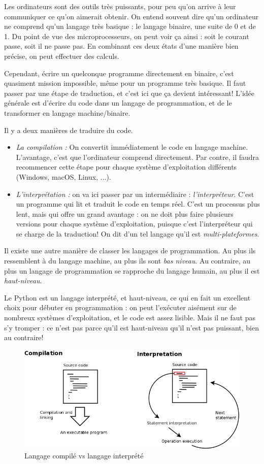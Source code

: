 Les ordinateurs sont des outils très puissants, pour peu qu'on arrive à leur communiquer ce qu'on aimerait obtenir. On entend souvent dire qu'un ordinateur ne comprend qu'un langage très basique : le langage binaire, une suite de 0 et de 1. Du point de vue des microprocesseurs, on peut voir ça ainsi : soit le courant passe, soit il ne passe pas. En combinant ces deux états d'une manière bien précise, on peut effectuer des calculs.

Cependant, écrire un quelconque programme directement en binaire, c'est quasiment mission impossible, même pour un programme très basique. Il faut passer par une étape de traduction, et c'est ici que ça devient intéressant! L'idée générale est d'écrire du code dans un langage de programmation, et de le transformer en langage machine/binaire.

Il y a deux manières de traduire du code.
\begin{itemize}
    \item \emph{La compilation :} On convertit immédiatement le code en langage machine. L'avantage, c'est que l'ordinateur comprend directement. Par contre, il faudra recommencer cette étape pour chaque système d'exploitation différents (Windows, macOS, Linux, ...).
    \item \emph{L'interprétation :} on va ici passer par un intermédiaire : \textit{l'interpréteur}. C'est un programme qui lit et traduit le code en temps réel. C'est un processus plus lent, mais qui offre un grand avantage : on ne doit plus faire plusieurs versions pour chaque système d'exploitation, puisque c'est l'interpréteur qui se charge de la traduction! On dit d'un tel langage qu'il est \textit{multi-plateformes}.
\end{itemize}


Il existe une autre manière de classer les langages de programmation. Au plus ils ressemblent à du langage machine, au plus ils sont \textit{bas niveau}. Au contraire, au plus un langage de programmation se rapproche du langage humain, au plus il est \textit{haut-niveau}.

Le Python est un langage interprété, et haut-niveau, ce qui en fait un excellent choix pour débuter en programmation : on peut l'exécuter aisément sur de nombreux systèmes d'exploitation, et le code est assez lisible. Mais il ne faut pas s'y tromper : ce n'est pas parce qu'il est haut-niveau qu'il n'est pas puissant, bien au contraire!

\begin{figure}[t]
	\includegraphics[width=\textwidth]{Ressources/inter.png}
	\caption{Langage compilé vs langage interprété}
\end{figure}